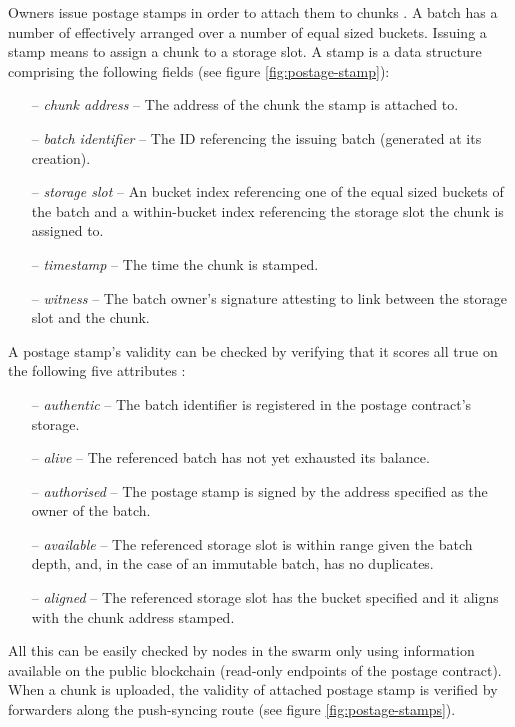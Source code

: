Owners issue postage stamps in order to attach them to chunks%
. A batch has a number of  effectively arranged over a number of equal sized buckets. Issuing a stamp means to assign a chunk to a storage slot. A stamp is a data structure comprising the following fields (see figure  \ref{fig:postage-stamp}):

\begin{itemize}[noitemsep]
    \item[--] \emph{chunk address} -- The address of the chunk the stamp is attached to. 
    \item[--] \emph{batch identifier} --  The ID referencing the issuing batch (generated at its creation).
    \item[--] \emph{storage slot} -- An bucket index referencing one of the equal sized buckets of the batch and a within-bucket index referencing the storage slot the chunk is assigned to.
    \item[--] \emph{timestamp} -- The time the chunk is stamped. 
    \item[--] \emph{witness} -- The batch owner's signature attesting to link between the storage slot and the chunk.
\end{itemize}

A postage stamp's validity can be checked by verifying that it scores all true on the following five attributes%
:

\begin{itemize}[noitemsep]
\item[--] \emph{authentic} -- The batch identifier is registered in the postage contract's storage.
\item[--] \emph{alive} -- The referenced batch has not yet exhausted its balance.
\item[--] \emph{authorised} -- The postage stamp is signed by the address specified as the owner of the batch. 
\item[--] \emph{available} -- The referenced storage slot is within range given the batch depth, and, in the case of an immutable batch, has no duplicates.
\item[--] \emph{aligned} -- The referenced storage slot has the bucket specified and it aligns with the chunk address stamped.
\end{itemize}

All this can be easily checked by nodes in the swarm only using information available on the public blockchain (read-only endpoints of the postage contract). When a chunk is uploaded, the validity of attached postage stamp is verified by forwarders along the push-syncing route  (see figure \ref{fig:postage-stamps}).


